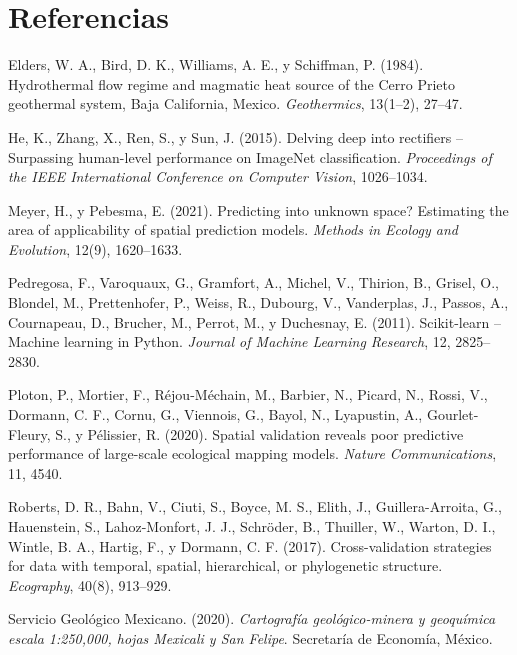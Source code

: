 \documentclass[10pt,twocolumn,a4paper]{article}
\newcommand{\apabibentry}[1]{\noindent\hangindent=0.6cm\hangafter=1 #1\vspace{0.25cm}\par}
\begin{document}
\vspace{0.50cm}

\section*{Referencias}
\vspace{0.25cm}

\apabibentry{Elders, W. A., Bird, D. K., Williams, A. E., y Schiffman, P. (1984). Hydrothermal flow regime and magmatic heat source of the Cerro Prieto geothermal system, Baja California, Mexico. \textit{Geothermics}, 13(1--2), 27--47.}

\apabibentry{He, K., Zhang, X., Ren, S., y Sun, J. (2015). Delving deep into rectifiers -- Surpassing human-level performance on ImageNet classification. \textit{Proceedings of the IEEE International Conference on Computer Vision}, 1026--1034.}

\apabibentry{Meyer, H., y Pebesma, E. (2021). Predicting into unknown space? Estimating the area of applicability of spatial prediction models. \textit{Methods in Ecology and Evolution}, 12(9), 1620--1633.}

\apabibentry{Pedregosa, F., Varoquaux, G., Gramfort, A., Michel, V., Thirion, B., Grisel, O., Blondel, M., Prettenhofer, P., Weiss, R., Dubourg, V., Vanderplas, J., Passos, A., Cournapeau, D., Brucher, M., Perrot, M., y Duchesnay, E. (2011). Scikit-learn -- Machine learning in Python. \textit{Journal of Machine Learning Research}, 12, 2825--2830.}

\apabibentry{Ploton, P., Mortier, F., Réjou-Méchain, M., Barbier, N., Picard, N., Rossi, V., Dormann, C. F., Cornu, G., Viennois, G., Bayol, N., Lyapustin, A., Gourlet-Fleury, S., y Pélissier, R. (2020). Spatial validation reveals poor predictive performance of large-scale ecological mapping models. \textit{Nature Communications}, 11, 4540.}

\apabibentry{Roberts, D. R., Bahn, V., Ciuti, S., Boyce, M. S., Elith, J., Guillera-Arroita, G., Hauenstein, S., Lahoz-Monfort, J. J., Schröder, B., Thuiller, W., Warton, D. I., Wintle, B. A., Hartig, F., y Dormann, C. F. (2017). Cross-validation strategies for data with temporal, spatial, hierarchical, or phylogenetic structure. \textit{Ecography}, 40(8), 913--929.}

\apabibentry{Servicio Geológico Mexicano. (2020). \textit{Cartografía geológico-minera y geoquímica escala 1:250,000, hojas Mexicali y San Felipe}. Secretaría de Economía, México.}
\end{document}
